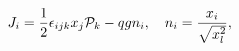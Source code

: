 \begin{equation}
J_i=\frac{1}{2}\epsilon_{ijk}x_j{\cal P}_k-
qg n_i,\quad n_i=\frac{x_i}{\sqrt{x_l^2}},
\label{jmono}
\end{equation}

